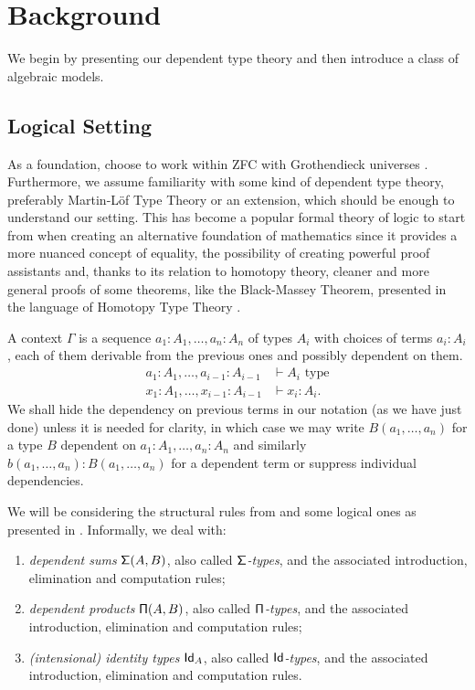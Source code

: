 \chapter{Background}\label{chapter1}

We begin by presenting our dependent type theory and then introduce a class of
algebraic models.

\section{Logical Setting}

As a foundation, choose to work within ZFC with Grothendieck universes
\cite{Jec13}.
Furthermore, we assume familiarity with some kind of dependent type theory,
preferably Martin-L\"{o}f Type Theory \cite{ML84} or an extension, which
should be enough to understand our setting. This has become a popular formal
theory of logic to start from when creating an alternative foundation of
mathematics since it provides a more nuanced concept of equality, the
possibility of creating powerful proof assistants and, thanks to its relation to
homotopy theory, cleaner and more general proofs of some theorems, like the
Black-Massey Theorem, presented in the language of Homotopy Type Theory
\cite{Uni13}.

\begin{notation}
  A context $\Gamma$ is a sequence $a_1:A_1,\ldots,a_n:A_n$ of types $A_i$ with
  choices of terms
  $a_i:A_i$, each of them derivable from the previous ones and possibly
  dependent on them.
  \begin{align*}
    a_1:A_1,\ldots,a_{i-1}:A_{i-1} &\vdash A_i \text{ type} \\
    x_1:A_1,\ldots,x_{i-1}:A_{i-1} &\vdash x_i:A_i.
  \end{align*}
  We shall hide the
  dependency on previous terms in our notation (as we have just done) unless
  it is needed for clarity, in which case we
  may write $B(a_1,\ldots,a_n)$ for a type $B$ dependent on
  $a_1:A_1,\ldots,a_n:A_n$ and similarly $b(a_1,\ldots,a_n):B(a_1,\ldots,a_n)$
  for a dependent term or suppress individual dependencies.
\end{notation}

\noindent
We will be considering the structural rules from \cite[App.\ A.1]{KL12} and some
logical ones as presented in \cite[App.\ A.2]{KL12}. Informally, we deal with:
\begin{enumerate}
  \item \emph{dependent sums} $\operatorname{\mathsf{\Sigma}}(A,B)$, also called
    \emph{$\operatorname{\mathsf{\Sigma}}$-types}, and the associated introduction, elimination and
    computation rules;
  \item \emph{dependent products} $\operatorname{\mathsf{\Pi}}(A,B)$, also called \emph{$\operatorname{\mathsf{\Pi}}$-types},
    and the associated introduction, elimination and computation rules;
  \item \emph{(intensional) identity types} $\operatorname{\mathsf{Id}}_A$, also called
    \emph{$\operatorname{\mathsf{Id}}$-types}, and the associated introduction, elimination and
    computation rules.
\end{enumerate}

